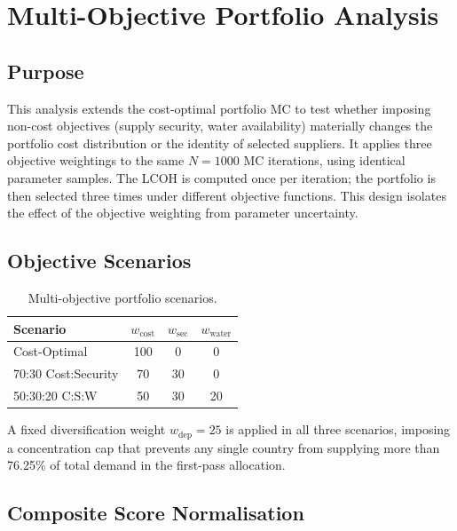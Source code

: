 \section{Multi-Objective Portfolio Analysis}
\label{sec:mc-multi}

\subsection{Purpose}

This analysis extends the cost-optimal portfolio MC to test whether imposing non-cost objectives (supply security, water availability) materially changes the portfolio cost distribution or the identity of selected suppliers. It applies three objective weightings to the same $N = 1000$ MC iterations, using identical parameter samples. The LCOH is computed once per iteration; the portfolio is then selected three times under different objective functions. This design isolates the effect of the objective weighting from parameter uncertainty.

\subsection{Objective Scenarios}

\begin{table}[htbp]
    \centering
    \caption{Multi-objective portfolio scenarios.}
    \label{tab:mc-objectives}
    \small
    \begin{tabular}{lccc}
        \toprule
        Scenario & $w_{\text{cost}}$ & $w_{\text{sec}}$ & $w_{\text{water}}$ \\
        \midrule
        Cost-Optimal        & 100 & 0  & 0  \\
        70:30 Cost:Security & 70  & 30 & 0  \\
        50:30:20 C:S:W      & 50  & 30 & 20 \\
        \bottomrule
    \end{tabular}
\end{table}

A fixed diversification weight $w_{\text{dep}} = 25$ is applied in all three scenarios, imposing a concentration cap that prevents any single country from supplying more than 76.25\% of total demand in the first-pass allocation.

\subsection{Composite Score Normalisation}

